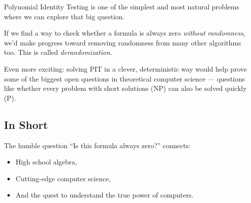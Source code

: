 Polynomial Identity Testing is one of the simplest and most natural problems where we can explore that big question.

If we find a way to check whether a formula is always zero \textit{without randomness}, we’d make progress toward removing randomness from many other algorithms too. This is called \textit{derandomization}.

Even more exciting: solving PIT in a clever, deterministic way would help prove some of the biggest open questions in theoretical computer science — questions like whether every problem with short solutions (NP) can also be solved quickly (P).

\subsection*{In Short}

The humble question “Is this formula always zero?” connects:
\begin{itemize}
  \item High school algebra,
  \item Cutting-edge computer science,
  \item And the quest to understand the true power of computers.
\end{itemize}